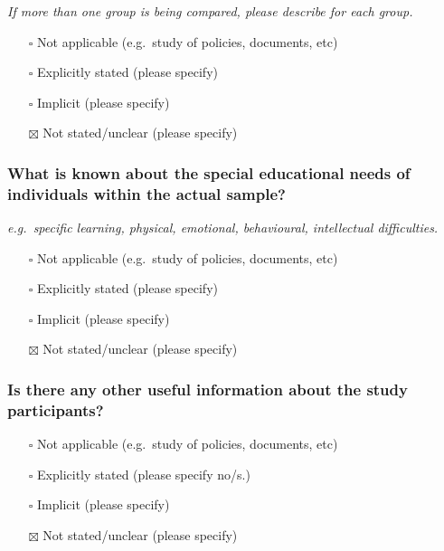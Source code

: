 \documentclass[
  doc, a4paper]{apa7}
\providecommand{\tightlist}{%
  \setlength{\itemsep}{0pt}\setlength{\parskip}{0pt}}
\begin{document}
\emph{If more than one group is being compared, please describe for each group.}

\begin{itemize}
\tightlist
\item[$\square$]
  Not applicable (e.g.~study of policies, documents, etc)
\item[$\square$]
  Explicitly stated (please specify)
\item[$\square$]
  Implicit (please specify)
\item[$\boxtimes$]
  Not stated/unclear (please specify)
\end{itemize}

\subsubsection{What is known about the special educational needs of individuals within the actual sample?}\label{what-is-known-about-the-special-educational-needs-of-individuals-within-the-actual-sample}

\emph{e.g.~specific learning, physical, emotional, behavioural, intellectual difficulties.}

\begin{itemize}
\tightlist
\item[$\square$]
  Not applicable (e.g.~study of policies, documents, etc)
\item[$\square$]
  Explicitly stated (please specify)
\item[$\square$]
  Implicit (please specify)
\item[$\boxtimes$]
  Not stated/unclear (please specify)
\end{itemize}

\subsubsection{Is there any other useful information about the study participants?}\label{is-there-any-other-useful-information-about-the-study-participants}

\begin{itemize}
\tightlist
\item[$\square$]
  Not applicable (e.g.~study of policies, documents, etc)
\item[$\square$]
  Explicitly stated (please specify no/s.)
\item[$\square$]
  Implicit (please specify)
\item[$\boxtimes$]
  Not stated/unclear (please specify)
\end{itemize}
\end{document}
